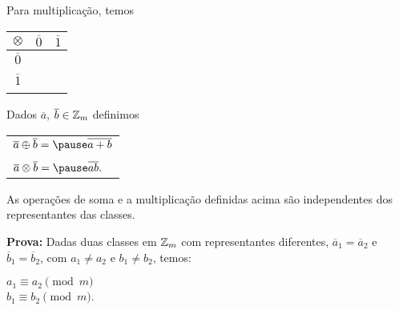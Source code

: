 \documentclass{beamer}
\begin{document}
    \begin{frame}
        Para multiplica{\c c}{\~a}o, temos
        \begin{table}[h]
           \setlength{\arrayrulewidth}{0,5\arrayrulewidth}
           \hskip-8.0cm
           \begin{tabular}{|c|c|c|}
              \hline
              $\otimes$ & $\overline{0}$ & $\overline{1}$\T\\
              \hline
              $\overline{0}$ & \phantom{abc} & \phantom{abc}\T\\
              & & \\
              \hline
              $\overline{1}$ & \phantom{abc} & \phantom{abc}\T\\
              & & \\
              \hline
           \end{tabular}
        \end{table}
    \end{frame}

    \begin{frame}
        \begin{definicao}
            Dados $\overline{a}$, $\overline{b} \in \mathbb{Z}_m$ definimos\pause
            \begin{center}
                \begin{tabular}{l}
                    $\overline{a}\oplus\overline{b} = \pause \overline{a + b}\label{soma_modulo_m}$\pause \\
                    \\
                    $\overline{a}\otimes\overline{b} = \pause \overline{ab}.\label{multiplicacao_modulo_m}$\pause
                \end{tabular}
            \end{center}
        \end{definicao}

        \begin{proposicao}
            As opera{\c c}{\~o}es de soma \pause e a multiplica\c{c}\~ao \pause definidas acima s{\~a}o independentes dos representantes das classes.\pause
        \end{proposicao}
        \noindent \textbf{Prova:} \pause
            Dadas duas classes em $\mathbb{Z}_m$ com representantes diferentes, \pause $\overline{a}_{1} = \overline{a}_{2}$ e \pause $\overline{b}_{1} = \overline{b}_{2}$, \pause com $a_{1}\ne a_{2}$ \pause e $b_{1}\ne b_{2}$, \pause temos:\pause
            \begin{center}
                $a_1 \equiv a_2 \pmod m$\pause\\
                $b_1 \equiv b_2 \pmod m$.
            \end{center}
    \end{frame}
\end{document}
